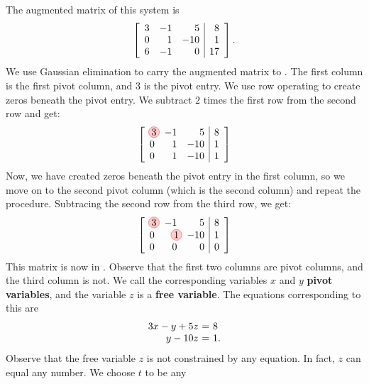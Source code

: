 \begin{solution} The augmented matrix of this system is
  \begin{equation*}
    \left[
    \begin{array}{rrr|r}
      3 &  -1  &  5 & 8 \\
      0 &   1 & -10 & 1 \\
      6 &  -1  &  0 & 17
    \end{array}
    \right].
  \end{equation*}
  We use Gaussian elimination to carry the augmented matrix to
  {\ef}. The first column is the first pivot column, and $3$ is the
  pivot entry. We use row operating to create zeros beneath the pivot
  entry. We subtract $2$ times the first row from the second row and get:
  \begin{equation*}
    \leftB
    \begin{array}{rrr|r}
      \circled{3} &  -1  &  5 & 8 \\
      0 &   1 & -10 & 1 \\
      0 &   1 & -10 & 1
    \end{array}
    \rightB 
  \end{equation*}
  Now, we have created zeros beneath the pivot entry in the first
  column, so we move on to the second pivot column (which is the
  second column) and repeat the procedure. Subtracing the second row
  from the third row, we get:
  \begin{equation*}
    \leftB
    \begin{array}{rrr|r}
      \circled{3} &  -1  &  5 & 8 \\
      0 &   \circled{1} & -10 & 1 \\
      0 &   0 & 0 & 0
    \end{array}
    \rightB
  \end{equation*}
  This matrix is now in {\ef}. Observe that the first two columns are
  pivot columns, and the third column is not. We call the
  corresponding variables $x$ and $y$
  \textbf{pivot variables},
  and the variable $z$ is a
  \textbf{free variable}.
  The equations corresponding to
  this {\ef} are
  \[
    \begin{array}{r@{~}c@{~}l}
      3x - y + 5z &=& 8 \\
      y - 10z &=& 1. 
    \end{array}
  \]
  Observe that the free variable $z$ is not constrained by any
  equation. In fact, $z$ can equal any number. We choose $t$ to be any

\end{solution}
